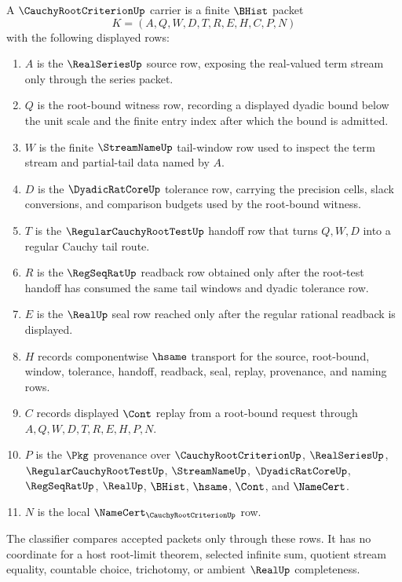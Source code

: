 \begin{definition}
\label{def:cauchy-root-criterion-carrier}
A $\CauchyRootCriterionUp$ carrier is a finite $\BHist$ packet
$$
K=(A,Q,W,D,T,R,E,H,C,P,N)
$$
with the following displayed rows:
\begin{enumerate}
\item $A$ is the $\RealSeriesUp$ source row, exposing the real-valued term stream only through the series packet.
\item $Q$ is the root-bound witness row, recording a displayed dyadic bound below the unit scale and the finite entry index after which the bound is admitted.
\item $W$ is the finite $\StreamNameUp$ tail-window row used to inspect the term stream and partial-tail data named by $A$.
\item $D$ is the $\DyadicRatCoreUp$ tolerance row, carrying the precision cells, slack conversions, and comparison budgets used by the root-bound witness.
\item $T$ is the $\RegularCauchyRootTestUp$ handoff row that turns $Q,W,D$ into a regular Cauchy tail route.
\item $R$ is the $\RegSeqRatUp$ readback row obtained only after the root-test handoff has consumed the same tail windows and dyadic tolerance row.
\item $E$ is the $\RealUp$ seal row reached only after the regular rational readback is displayed.
\item $H$ records componentwise $\hsame$ transport for the source, root-bound, window, tolerance, handoff, readback, seal, replay, provenance, and naming rows.
\item $C$ records displayed $\Cont$ replay from a root-bound request through $A,Q,W,D,T,R,E,H,P,N$.
\item $P$ is the $\Pkg$ provenance over $\CauchyRootCriterionUp$, $\RealSeriesUp$, $\RegularCauchyRootTestUp$, $\StreamNameUp$, $\DyadicRatCoreUp$, $\RegSeqRatUp$, $\RealUp$, $\BHist$, $\hsame$, $\Cont$, and $\NameCert$.
\item $N$ is the local $\NameCert_{\CauchyRootCriterionUp}$ row.
\end{enumerate}
The classifier compares accepted packets only through these rows. It has no coordinate for a host root-limit theorem, selected infinite sum, quotient stream equality, countable choice, trichotomy, or ambient $\RealUp$ completeness.
\end{definition}

